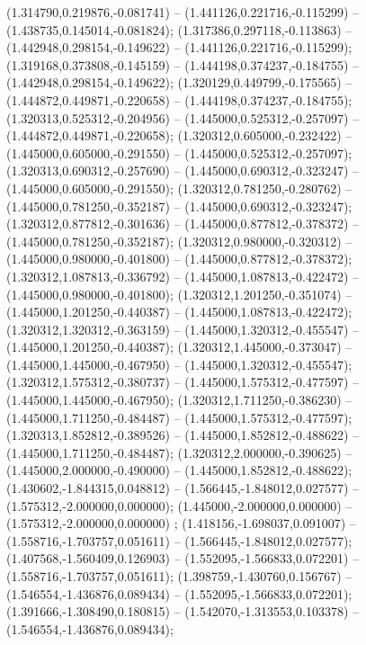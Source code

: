  (1.314790,0.219876,-0.081741) -- (1.441126,0.221716,-0.115299) -- (1.438735,0.145014,-0.081824);
 (1.317386,0.297118,-0.113863) -- (1.442948,0.298154,-0.149622) -- (1.441126,0.221716,-0.115299);
 (1.319168,0.373808,-0.145159) -- (1.444198,0.374237,-0.184755) -- (1.442948,0.298154,-0.149622);
 (1.320129,0.449799,-0.175565) -- (1.444872,0.449871,-0.220658) -- (1.444198,0.374237,-0.184755);
 (1.320313,0.525312,-0.204956) -- (1.445000,0.525312,-0.257097) -- (1.444872,0.449871,-0.220658);
 (1.320312,0.605000,-0.232422) -- (1.445000,0.605000,-0.291550) -- (1.445000,0.525312,-0.257097);
 (1.320313,0.690312,-0.257690) -- (1.445000,0.690312,-0.323247) -- (1.445000,0.605000,-0.291550);
 (1.320312,0.781250,-0.280762) -- (1.445000,0.781250,-0.352187) -- (1.445000,0.690312,-0.323247);
 (1.320312,0.877812,-0.301636) -- (1.445000,0.877812,-0.378372) -- (1.445000,0.781250,-0.352187);
 (1.320312,0.980000,-0.320312) -- (1.445000,0.980000,-0.401800) -- (1.445000,0.877812,-0.378372);
 (1.320312,1.087813,-0.336792) -- (1.445000,1.087813,-0.422472) -- (1.445000,0.980000,-0.401800);
 (1.320312,1.201250,-0.351074) -- (1.445000,1.201250,-0.440387) -- (1.445000,1.087813,-0.422472);
 (1.320312,1.320312,-0.363159) -- (1.445000,1.320312,-0.455547) -- (1.445000,1.201250,-0.440387);
 (1.320312,1.445000,-0.373047) -- (1.445000,1.445000,-0.467950) -- (1.445000,1.320312,-0.455547);
 (1.320312,1.575312,-0.380737) -- (1.445000,1.575312,-0.477597) -- (1.445000,1.445000,-0.467950);
 (1.320312,1.711250,-0.386230) -- (1.445000,1.711250,-0.484487) -- (1.445000,1.575312,-0.477597);
 (1.320313,1.852812,-0.389526) -- (1.445000,1.852812,-0.488622) -- (1.445000,1.711250,-0.484487);
 (1.320312,2.000000,-0.390625) -- (1.445000,2.000000,-0.490000) -- (1.445000,1.852812,-0.488622);
 (1.430602,-1.844315,0.048812) -- (1.566445,-1.848012,0.027577) -- (1.575312,-2.000000,0.000000);
 (1.445000,-2.000000,0.000000) -- (1.575312,-2.000000,0.000000) ;
 (1.418156,-1.698037,0.091007) -- (1.558716,-1.703757,0.051611) -- (1.566445,-1.848012,0.027577);
 (1.407568,-1.560409,0.126903) -- (1.552095,-1.566833,0.072201) -- (1.558716,-1.703757,0.051611);
 (1.398759,-1.430760,0.156767) -- (1.546554,-1.436876,0.089434) -- (1.552095,-1.566833,0.072201);
 (1.391666,-1.308490,0.180815) -- (1.542070,-1.313553,0.103378) -- (1.546554,-1.436876,0.089434);
